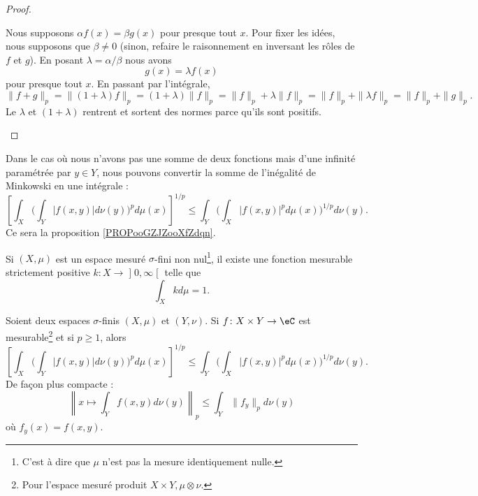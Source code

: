 \begin{proof}
\begin{subproof}
\begin{subproof}
			\spitem[\( \Leftarrow\)]
			Nous supposons \( \alpha f(x)=\beta g(x)\) pour presque tout \( x\). Pour fixer les idées, nous supposons que \( \beta\neq 0\) (sinon, refaire le raisonnement en inversant les rôles de \( f\) et \( g\)). En posant \( \lambda=\alpha/\beta\) nous avons
			\begin{equation}
				g(x)=\lambda f(x)
			\end{equation}
			pour presque tout \( x\). En passant par l'intégrale,
			\begin{equation}
				\| f+g \|_p=\| (1+\lambda)f \|_p=(1+\lambda)\| f \|_p=\| f \|_p+\lambda\| f \|_p=\| f \|_p+\| \lambda f \|_p=\| f \|_p+\| g \|_p.
			\end{equation}
			Le \( \lambda\) et \( (1+\lambda)\) rentrent et sortent des normes parce qu'ils sont positifs.
		\end{subproof}
	\end{subproof}
\end{proof}

Dans le cas où nous n'avons pas une somme de deux fonctions mais d'une infinité paramétrée par \( y\in Y\), nous pouvons convertir la somme de l'inégalité de Minkowski en une intégrale :
\begin{equation}
	\left[ \int_X\Big( \int_Y| f(x,y) |d\nu(y) \Big)^pd\mu(x) \right]^{1/p}\leq \int_Y\Big( \int_X| f(x,y) |^pd\mu(x) \Big)^{1/p}d\nu(y).
\end{equation}
Ce sera la proposition \ref{PROPooGZJZooXfZdqn}.

\begin{lemma}       \label{LEMooPSBWooGLggTe}
	Si \( (X,\mu)\) est un espace mesuré \( \sigma\)-fini non nul\footnote{C'est à dire que \( \mu\) n'est pas la mesure identiquement nulle.}, il existe une fonction mesurable strictement positive \( k\colon X\to \mathopen] 0 , \infty \mathclose[\) telle que
	\begin{equation}
		\int_Xkd\mu=1.
	\end{equation}
\end{lemma}

\begin{proposition}     \label{PROPooGZJZooXfZdqn}
	Soient deux espaces \( \sigma\)-finis \( (X,\mu)\) et \( (Y,\nu)\). Si \( f\colon X\times Y\to \eC\) est mesurable\footnote{Pour l'espace mesuré produit \(  X\times Y, \mu\otimes \nu\).} et si \( p\geq 1\), alors
	\begin{equation}        \label{EQooAEXWooYJtGGR}
		\left[ \int_X\Big( \int_Y| f(x,y) |d\nu(y) \Big)^pd\mu(x) \right]^{1/p}\leq \int_Y\Big( \int_X| f(x,y) |^pd\mu(x) \Big)^{1/p}d\nu(y).
	\end{equation}
	De façon plus compacte :
	\begin{equation}
		\left\|   x\mapsto\int_Y f(x,y)d\nu(y)   \right\|_p\leq \int_Y  \| f_y \|_pd\nu(y)
	\end{equation}
	où \( f_y(x)=f(x,y)\).
\end{proposition}


